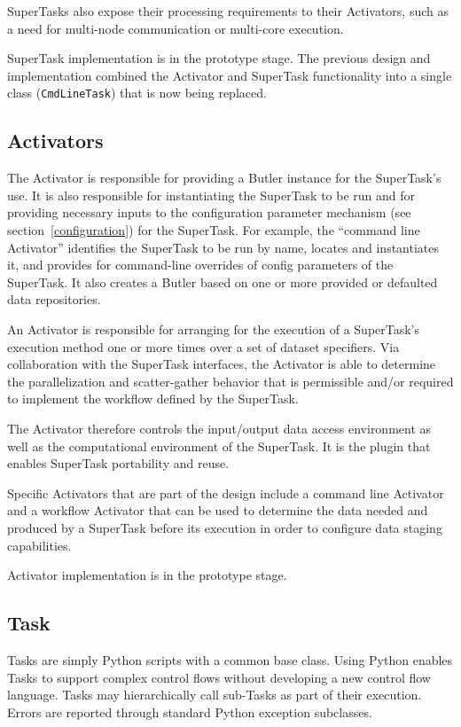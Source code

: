 \documentclass[DM,toc]{lsstdoc}
\begin{document}
SuperTasks also expose their processing requirements to their Activators, such
as a need for multi-node communication or multi-core execution.

SuperTask implementation is in the prototype stage.  The previous design and
implementation combined the Activator and SuperTask functionality into a single
class (\texttt{CmdLineTask}) that is now being replaced.

\subsection{Activators}\label{activators}

The Activator is responsible for providing a Butler instance for the
SuperTask’s use. It is also responsible for instantiating the SuperTask to be
run and for providing necessary inputs to the configuration parameter mechanism
(see section~\ref{configuration}) for the SuperTask. For example, the “command
line Activator” identifies the SuperTask to be run by name, locates and
instantiates it, and provides for command-line overrides of config parameters
of the SuperTask. It also creates a Butler based on one or more provided or
defaulted data repositories.

An Activator is responsible for arranging for the execution of a SuperTask’s
execution method one or more times over a set of dataset specifiers. Via
collaboration with the SuperTask interfaces, the Activator is able to determine
the parallelization and scatter-gather behavior that is permissible and/or
required to implement the workflow defined by the SuperTask.

The Activator therefore controls the input/output data access environment as
well as the computational environment of the SuperTask.  It is the plugin that
enables SuperTask portability and reuse.

Specific Activators that are part of the design include a command line
Activator and a workflow Activator that can be used to determine the data
needed and produced by a SuperTask before its execution in order to configure
data staging capabilities.

Activator implementation is in the prototype stage.

\subsection{Task}\label{task}

Tasks are simply Python scripts with a common base class. Using Python enables
Tasks to support complex control flows without developing a new control flow
language. Tasks may hierarchically call sub-Tasks as part of their execution.
Errors are reported through standard Python exception subclasses.
\end{document}
